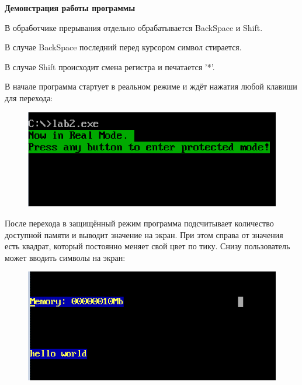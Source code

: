\begin{center}
	{\bf\normalsize Демонстрация работы программы}
\end{center}

В обработчике прерывания отдельно обрабатывается BackSpace и Shift.

В случае BackSpace последний перед курсором символ стирается.

В случае Shift происходит смена регистра и печатается '*'.



В начале программа стартует в реальном режиме и ждёт нажатия любой клавиши для перехода:

\begin{figure}[!ht]
	\begin{center}
		\includegraphics[width=16cm]{inc/start.png}
	\end{center}
\end{figure}

После перехода в защищённый режим программа подсчитывает количество доступной памяти и выводит значение на экран.
При этом справа от значения есть квадрат, который постоянно меняет свой цвет по тику.
Снизу пользователь может вводить символы на экран:

\begin{figure}[!ht]
	\begin{center}
		\includegraphics[width=16cm]{inc/protectedmode.png}
	\end{center}
\end{figure}





